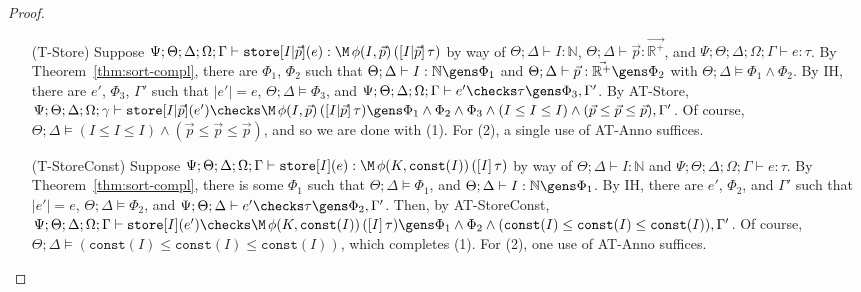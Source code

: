 \begin{proof}
\begin{itemize}
  \item[(T-Store)] Suppose
  $\Psi ; \Theta ; \Delta ; \Omega ; \Gamma \vdash \texttt{store}[I|\vec{p}](e) : \M \, \phi(I,\vec{p}) \, ([I| \vec{p}] \, \tau)$ by way of
  $\Theta ; \Delta \vdash I : \mathbb{N}$,
  $\Theta ; \Delta \vdash \vec{p} : \vec{\mathbb{R}^+}$, and
  $\Psi ; \Theta ; \Delta ; \Omega ; \Gamma \vdash e : \tau$.
  By Theorem~\ref{thm:sort-compl}, there are $\Phi_1$, $\Phi_2$ such that
  $\Theta ; \Delta \vdash I : \mathbb{N} \gens \Phi_1$ and
  $\Theta ; \Delta \vdash \vec{p} : \vec{\mathbb{R}^+} \gens \Phi_2$
  with $\Theta ; \Delta \vDash \Phi_1 \wedge \Phi_2$.
  By IH, there are $e'$, $\Phi_3$, $\Gamma'$ such that
  $|e'| = e$,
  $\Theta ; \Delta \vDash \Phi_3$, and
  $\Psi ; \Theta ; \Delta ; \Omega; \Gamma \vdash e' \checks \tau \gens \Phi_3,\Gamma'$.
  By AT-Store,
  $\Psi ; \Theta ; \Delta ; \Omega ; \gamma \vdash \texttt{store}[I|\vec{p}](e') \checks \M \, \phi(I,\vec{p}) \, ([I| \vec{p}] \, \tau) \gens \Phi_1 \wedge \Phi_2 \wedge \Phi_3 \wedge (I \leq I \leq I) \wedge (\vec{p} \leq \vec{p} \leq \vec{p}),\Gamma'$.
  Of course, $\Theta ; \Delta \vDash (I \leq I \leq I) \wedge (\vec{p} \leq \vec{p} \leq \vec{p})$, and so
  we are done with (1). For (2), a single use of AT-Anno suffices.
  
    
  \item[(T-StoreConst)] Suppose
  $\Psi ; \Theta ; \Delta ; \Omega ; \Gamma \vdash \texttt{store}[I](e) : \M \, \phi(K,\texttt{const}(I)) \, ([I] \, \tau)$ by way of
  $\Theta ; \Delta \vdash I : \mathbb{N}$ and
  $\Psi ; \Theta ; \Delta ; \Omega ; \Gamma \vdash e : \tau$.
  By Theorem~\ref{thm:sort-compl}, there is some $\Phi_1$ such that
  $\Theta ; \Delta \vDash \Phi_1$, and
  $\Theta ; \Delta \vdash I : \mathbb{N} \gens \Phi_1$.
  By IH, there are $e'$, $\Phi_2$, and $\Gamma'$ such that
  $|e'| = e$,
  $\Theta ; \Delta \vDash \Phi_2$, and
  $\Psi ; \Theta ; \Delta \vdash e' \checks \tau \gens \Phi_2,\Gamma'$.
  Then, by AT-StoreConst,
  $\Psi ; \Theta ; \Delta ; \Omega ; \Gamma \vdash \texttt{store}[I](e') \checks \M \, \phi(K,\texttt{const}(I)) \, ([I] \, \tau) \gens \Phi_1 \wedge \Phi_2 \wedge (\texttt{const}(I) \leq \texttt{const}(I) \leq \texttt{const}(I)),\Gamma'$.
  Of course, $\Theta ; \Delta \vDash (\texttt{const}(I) \leq \texttt{const}(I) \leq \texttt{const}(I))$,
  which completes (1). For (2), one use of AT-Anno suffices.


\end{itemize}
\end{proof}
